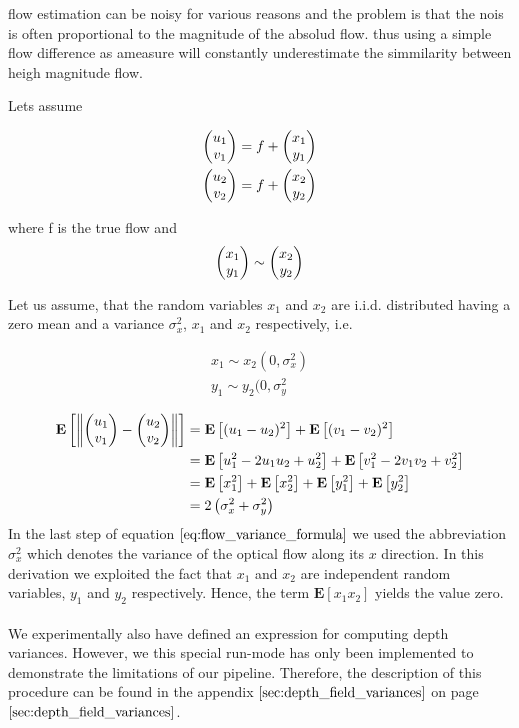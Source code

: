 flow estimation can be noisy for various reasons and the problem is that the nois is often proportional to the magnitude of the absolud flow. thus using a simple flow difference as ameasure will constantly underestimate the simmilarity between heigh magnitude flow. 

Lets assume 

\begin{equation}
\begin{aligned}
\colvec{u_1}{v_1} = f + \colvec{x_1}{y_1} \\
\colvec{u_2}{v_2} = f + \colvec{x_2}{y_2}
\end{aligned}
\label{eq:def_flow_tracking}	
\end{equation}

where f is the true flow and 
\begin{equation}
	\colvec{x_1}{y_1} \sim \colvec{x_2}{y_2}
\end{equation}

Let us assume, that the random variables $x_1$ and $x_2$ are i.i.d. distributed having a zero mean and a variance $\sigma_x^2$, $x_1$ and $x_2$ respectively, i.e.

\begin{equation}
\begin{aligned}
x_1 \sim x_2 (0, \sigma_x^2) \\
y_1 \sim y_2 (0, \sigma_y^2
\end{aligned}
\label{eq:def_flow_tracking}	
\end{equation}

\begin{equation}
\begin{aligned}
\mathbf{E} \left[ \norm{\colvec{u_1}{v_1} - \colvec{u_2}{v_2}} \right]
& = \mathbf{E} \left[ (u_1 - u_2)^2 \right] + \mathbf{E} \left[ (v_1 - v_2)^2 \right] \\
& = \mathbf{E} \left[ u_1^2 - 2 u_1 u_2 + u_2^2 \right] + \mathbf{E} \left[ v_1^2 - 2 v_1 v_2 + v_2^2 \right] \\
& = \mathbf{E} \left[ x_1^2 \right] + \mathbf{E} \left[ x_2^2 \right] + \mathbf{E} \left[ y_1^2 \right] + \mathbf{E} \left[ y_2^2 \right] \\
& = 2 \left( \sigma_x^2 + \sigma_y^2 \right)
\end{aligned}
\label{eq:flow_variance_formula}	
\end{equation}
In the last step of equation $\ref{eq:flow_variance_formula}$ we used the abbreviation $\sigma_x^2$ which denotes the variance of the optical flow along its $x$ direction. In this derivation we exploited the fact that $x_1$ and $x_2$ are independent random variables, $y_1$ and $y_2$ respectively. Hence, the term $\mathbf{E} \left[ x_1 x_2\right]$ yields the value zero. \\ \\
We experimentally also have defined an expression for computing depth variances. However, we this special run-mode has only been implemented to demonstrate the limitations of our pipeline. Therefore, the description of this procedure can be found in the appendix $\ref{sec:depth_field_variances}$ on page $\pageref{sec:depth_field_variances}$.

